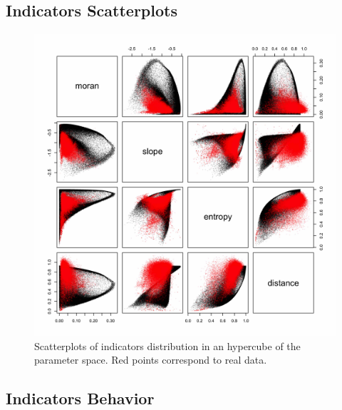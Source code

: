\subsection*{Indicators Scatterplots}



\begin{figure}
\includegraphics[width=\textwidth]{figuresraw/scatter}
\caption{Scatterplots of indicators distribution in an hypercube of the parameter space. Red points correspond to real data.}
\label{fig:densityscatter}
\end{figure}



\subsection*{Indicators Behavior}




